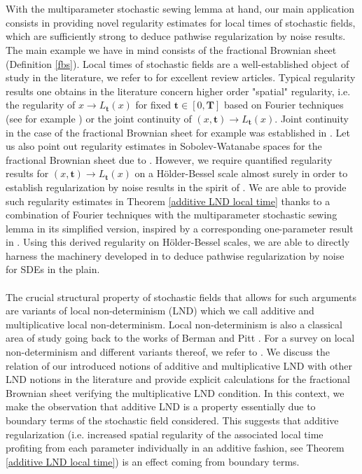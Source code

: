 \documentclass[11pt,oneside,english,reqno]{amsart}
\numberwithin{equation}{section}
\numberwithin{figure}{section}
\theoremstyle{plain}
\theoremstyle{definition}
\theoremstyle{remark}
\theoremstyle{plain}
\theoremstyle{plain}
\theoremstyle{plain}
\theoremstyle{plain}
\theoremstyle{plain}
\newcommand{\bT}{\mathbf{T}}
\newcommand{\bt}{\mathbf{t}}
\begin{document}
\\
\\
With the multiparameter stochastic sewing lemma at hand, our main application consists in providing novel regularity estimates for local times of stochastic fields, which are sufficiently strong to deduce pathwise regularization by noise results. The main example we have in mind consists of the fractional Brownian sheet (Definition \ref{fbs}). Local times of stochastic fields are a well-established object of study in the literature, we refer to \cite{Dozzi2003, horowitz} for excellent review articles. Typical regularity results one obtains in the literature concern higher order "spatial" regularity, i.e. the regularity of $x\to L_\bt(x)$ for fixed $\bt\in [0, \bT]$ based on Fourier techniques (see for example \cite[Theorem 28.1]{horowitz})  or the joint continuity of $(x, \bt)\to L_{\bt}(x)$.  Joint continuity in the case of the fractional Brownian sheet for example was established in \cite{Xiao2002}. Let us also point out regularity estimates in Sobolev-Watanabe spaces for the fractional Brownian sheet due to \cite{Tudor2003}. However, we require quantified regularity results for $(x, \bt)\to L_{\bt}(x)$ on a H\"older-Bessel scale almost surely in order to establish regularization by noise results in the spirit of \cite{Bechtold2023}. We are able to provide such regularity estimates in Theorem \ref{additive LND local time} thanks to a combination of Fourier techniques with the multiparameter stochastic sewing lemma in its simplified version, inspired by a corresponding one-parameter result in \cite{harang2020cinfinity}. Using this derived regularity on H\"older-Bessel scales, we are able to directly harness the machinery developed in \cite{Bechtold2023} to deduce pathwise regularization by noise for SDEs in the plain. \\
\\
The crucial structural property of stochastic fields that allows for such arguments are variants of local non-determinism (LND) which we call additive and multiplicative local non-determinism. Local non-determinism is also a classical area of study going back to the works of Berman \cite{berman} and Pitt \cite{pitt}. For a survey on local non-determinism and different variants thereof, we refer to \cite{Xiao2009}. We discuss the relation of our introduced notions of additive and multiplicative LND with other LND notions in the literature and provide explicit calculations for the fractional Brownian sheet verifying the multiplicative LND condition. In this context, we make the observation that additive LND is a property essentially due to boundary terms of the stochastic field considered. This suggests that additive regularization (i.e. increased spatial regularity of the associated local time profiting from each parameter individually in an additive fashion, see Theorem \ref{additive LND local time}) is an effect coming from boundary terms. 
\end{document}
